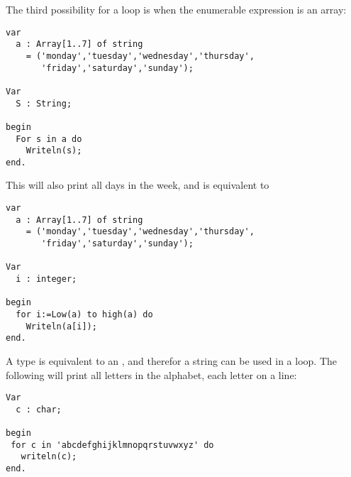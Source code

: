 The third possibility for a  loop is when the enumerable expression 
is an array: 
\begin{verbatim}
var
  a : Array[1..7] of string 
    = ('monday','tuesday','wednesday','thursday',
       'friday','saturday','sunday');
 
Var
  S : String; 
       
begin
  For s in a do
    Writeln(s);
end.
\end{verbatim}
This will also print all days in the week, and is equivalent to 
\begin{verbatim}
var
  a : Array[1..7] of string
    = ('monday','tuesday','wednesday','thursday',
       'friday','saturday','sunday');

Var
  i : integer;

begin
  for i:=Low(a) to high(a) do
    Writeln(a[i]);
end.
\end{verbatim}
A  type is equivalent to an , and therefor
a string can be used in a  loop. The following will
print all letters in the alphabet, each letter on a line:
\begin{verbatim}
Var
  c : char;
  
begin
 for c in 'abcdefghijklmnopqrstuvwxyz' do
   writeln(c);
end.
\end{verbatim}

